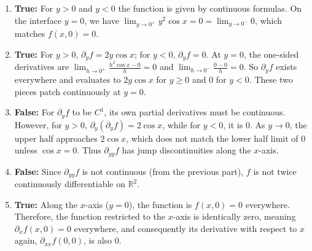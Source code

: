 \begin{exercisesolution}
\label{sol:piecewise_differentiability_tf}
\begin{enumerate}[label=\textbf{(\alph*)}]
  \item \textbf{True:} For $y > 0$ and $y < 0$ the function is given by continuous formulas. On the interface $y=0$, we have $\lim_{y \to 0^+} y^2 \cos x = 0 = \lim_{y \to 0^-} 0$, which matches $f(x,0) = 0$.
  \item \textbf{True:} For $y > 0$, $\partial_y f = 2y \cos x$; for $y < 0$, $\partial_y f = 0$. At $y=0$, the one-sided derivatives are $\lim_{h \to 0^+} \frac{h^2 \cos x - 0}{h} = 0$ and $\lim_{h \to 0^-} \frac{0 - 0}{h} = 0$. So $\partial_y f$ exists everywhere and evaluates to $2y \cos x$ for $y \ge 0$ and $0$ for $y < 0$. These two pieces patch continuously at $y=0$.
  \item \textbf{False:} For $\partial_y f$ to be $C^1$, its own partial derivatives must be continuous. However, for $y>0$, $\partial_y(\partial_y f) = 2 \cos x$, while for $y<0$, it is $0$. As $y \to 0$, the upper half approaches $2 \cos x$, which does not match the lower half limit of $0$ unless $\cos x = 0$. Thus $\partial_{yy} f$ has jump discontinuities along the $x$-axis.
  \item \textbf{False:} Since $\partial_{yy}f$ is not continuous (from the previous part), $f$ is not twice continuously differentiable on $\mathbb{R}^2$.
  \item \textbf{True:} Along the $x$-axis ($y=0$), the function is $f(x,0) = 0$ everywhere. Therefore, the function restricted to the $x$-axis is identically zero, meaning $\partial_x f(x,0) = 0$ everywhere, and consequently its derivative with respect to $x$ again, $\partial_{xx} f(0,0)$, is also $0$.
\end{enumerate}
\end{exercisesolution}

